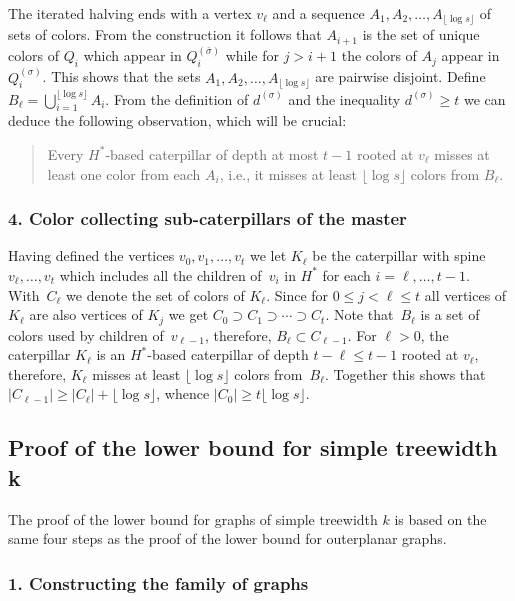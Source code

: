 \documentclass[11pt]{article}
\begin{document}
The iterated halving ends with a vertex $v_\ell$ and a sequence
$A_1,A_2,\ldots,A_{\lfloor\log s\rfloor}$ of sets of colors. From the construction it follows that
$A_{i+1}$ is the set of unique colors of $Q_i$ which appear in
$Q_i^{(\bar{\sigma})}$ while for $j>i+1$ the colors of $A_j$ appear in
$Q_i^{(\sigma)}$. This shows that the sets $A_1,A_2,\ldots,A_{\lfloor\log s\rfloor}$ are pairwise
disjoint. Define $B_\ell=\bigcup_{i=1}^{\lfloor\log s\rfloor}A_i$. From the definition of
$d^{(\sigma)}$ and the inequality $d^{(\sigma)}\geq t$ we can deduce the following
observation, which will be crucial:
\begin{quote}
  Every $H^*$-based caterpillar of depth at most ${t-1}$ rooted at $v_\ell$
  misses at least one color from each $A_i$, i.e., it misses at least
  $\lfloor\log s\rfloor$ colors from $B_\ell$.
\end{quote}

\subsubsection*{4.  Color collecting sub-caterpillars of the master}\hfill

Having defined the vertices $v_0,v_1,\ldots,v_{t}$ we let $K_\ell$ be the
caterpillar with spine $v_\ell,\ldots,v_{t}$ which includes all the children
of~$v_i$ in $H^*$ for each $i=\ell,\ldots,{t-1}$.  With~$C_\ell$ we denote the
set of colors of $K_\ell$.  Since for $0\leq j<\ell\leq t$ all vertices of
$K_\ell$ are also vertices of $K_j$ we get
$C_0\supset C_1\supset\cdots\supset C_t$.  Note that~$B_{\ell}$ is a set of
colors used by children of~$v_{\ell-1}$, therefore,
$B_\ell\subset C_{\ell-1}$.  For $\ell>0$, the caterpillar $K_\ell$ is an
$H^*$-based caterpillar of depth $t- \ell \leq {t-1}$ rooted at $v_\ell$,
therefore, $K_\ell$ misses at least $\lfloor\log s\rfloor$ colors from~$B_\ell$. Together
this shows that $|C_{\ell-1}| \geq |C_\ell|+\lfloor\log s\rfloor$, whence $|C_0|\geq t\lfloor\log s\rfloor$.

\subsection{Proof of the lower bound for simple treewidth k}\hfill
\label{sec:simple-k-low}

The proof of the lower bound for graphs of simple treewidth $k$ is based on the
same four steps as the proof of the lower bound for outerplanar graphs.

\subsubsection*{1.  Constructing the family of graphs}\hfill
\end{document}

